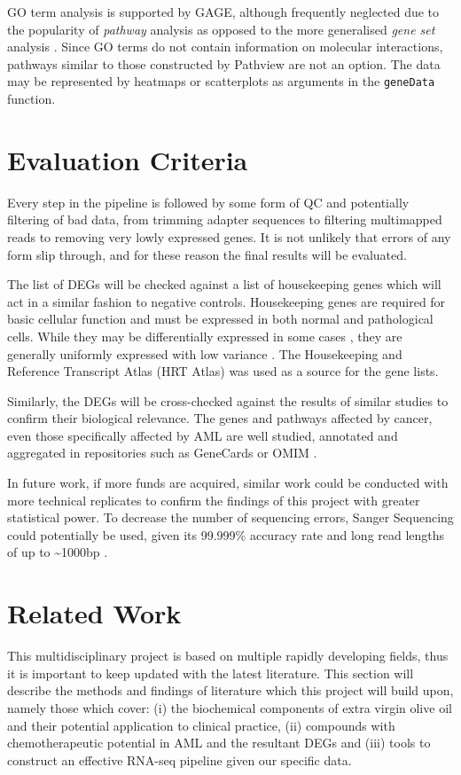 \ac{GO} term analysis is supported by GAGE, although frequently neglected due to the popularity of \textit{pathway} analysis as opposed to the more generalised \textit{gene set} analysis \citep{luo2009gage}. Since \ac{GO} terms do not contain information on molecular interactions, pathways similar to those constructed by Pathview are not an option. The data may be represented by heatmaps or scatterplots as arguments in the \texttt{geneData} function.


\clearpage
\section{Evaluation Criteria}
Every step in the pipeline is followed by some form of QC and potentially filtering of bad data, from trimming adapter sequences to filtering multimapped reads to removing very lowly expressed genes. It is not unlikely that errors of any form slip through, and for these reason the final results will be evaluated.

The list of \ac{DEG}s will be checked against a list of housekeeping genes which will act in a similar fashion to negative controls. Housekeeping genes are required for basic cellular function and must be expressed in both normal and pathological cells. While they may be differentially expressed in some cases \citep{greer2010housekeeping}, they are generally uniformly expressed with low variance \citep{khimani2005housekeeping}. The Housekeeping and Reference Transcript Atlas (HRT Atlas) \citep{hounkpe2021hrt} was used as a source for the gene lists. %

Similarly, the \ac{DEG}s will be cross-checked against the results of similar studies to confirm their biological relevance. The genes and pathways affected by cancer, even those specifically affected by \ac{AML} are well studied, annotated and aggregated in repositories such as GeneCards \citep{stelzer2016genecards} or OMIM \citep{hamosh2005online}. 

In future work, if more funds are acquired, similar work could be conducted with more technical replicates to confirm the findings of this project with greater statistical power. To decrease the number of sequencing errors, Sanger Sequencing could potentially be used, given its 99.999\% accuracy rate and long read lengths of up to \textasciitilde 1000bp \citep{shendure2008next}.

\clearpage
\section{Related Work}
This multidisciplinary project is based on multiple rapidly developing fields, thus it is important to keep updated with the latest literature. This section will describe the methods and findings of literature which this project will build upon, namely those which cover: (i) the biochemical components of extra virgin olive oil and their potential application to clinical practice, (ii) compounds with chemotherapeutic potential in \ac{AML} and the resultant \ac{DEG}s and (iii) tools to construct an effective RNA-seq pipeline given our specific data.

